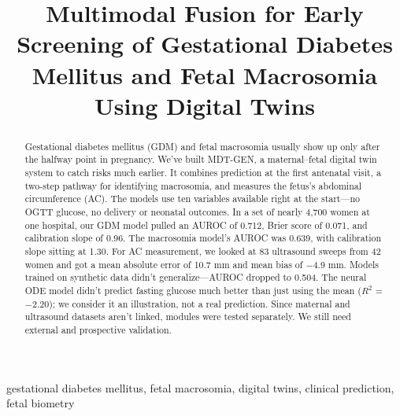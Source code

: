 \documentclass[conference]{IEEEtran}
\begin{document}
\title{Multimodal Fusion for Early Screening of Gestational Diabetes Mellitus and Fetal Macrosomia Using Digital Twins}

\author{
\and
{}
\and
{}
}

\maketitle


\begin{abstract}
Gestational diabetes mellitus (GDM) and fetal macrosomia usually show up only after the halfway point in pregnancy. We've built MDT-GEN, a maternal--fetal digital twin system to catch risks much earlier. It combines prediction at the first antenatal visit, a two-step pathway for identifying macrosomia, and measures the fetus's abdominal circumference (AC). The models use ten variables available right at the start---no OGTT glucose, no delivery or neonatal outcomes. In a set of nearly 4,700 women at one hospital, our GDM model pulled an AUROC of 0.712, Brier score of 0.071, and calibration slope of 0.96. The macrosomia model's AUROC was 0.639, with calibration slope sitting at 1.30. For AC measurement, we looked at 83 ultrasound sweeps from 42 women and got a mean absolute error of 10.7 mm and mean bias of \ensuremath{-}4.9 mm. Models trained on synthetic data didn't generalize---AUROC dropped to 0.504. The neural ODE model didn't predict fasting glucose much better than just using the mean ($R^2$ = \ensuremath{-}2.20); we consider it an illustration, not a real prediction. Since maternal and ultrasound datasets aren't linked, modules were tested separately. We still need external and prospective validation.
\end{abstract}

\begin{IEEEkeywords}gestational diabetes mellitus, fetal macrosomia, digital twins, clinical prediction, fetal biometry\end{IEEEkeywords}
\end{document}
